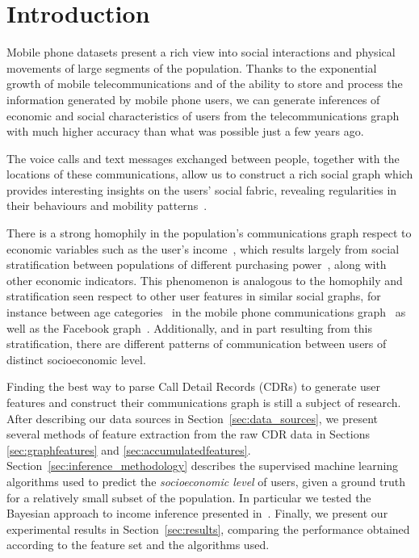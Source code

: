 \section{Introduction}

Mobile phone datasets present a rich view into social interactions and physical movements of large segments of the population. Thanks to the exponential growth of mobile telecommunications and of the ability to store and process the information generated by mobile phone users, we can generate inferences of economic and social characteristics of users from the telecommunications graph with much higher accuracy than what was possible just a few years ago.

The voice calls and text messages exchanged between people, together with the locations of these communications, allow us to construct a rich social graph which provides interesting insights on the users' social fabric, revealing regularities in their behaviours and mobility patterns~\cite{gonzalez2008understanding,ponieman2013human,sarraute2015city}.

There is a strong homophily in the population's communications graph respect to economic variables such as the user's income~\cite{fixmanasonam2016}, 
which results largely from social stratification between populations of different purchasing power~\cite{leo2015socioeconomic}, along with other economic indicators.
This phenomenon is analogous to the homophily and stratification seen respect to other user features in similar social graphs, for instance between age categories~\cite{mcpherson2001birds} in the mobile phone communications graph~\cite{sarraute2014} as well as the Facebook graph~\cite{ugander2011anatomy}.
Additionally, and in part resulting from this stratification, there are different patterns of communication between users of distinct socioeconomic level. 

Finding the best way to parse Call Detail Records (CDRs) to generate user features and construct their communications graph is still a subject of research. 
After describing our data sources in Section~\ref{sec:data_sources},
we present several methods of feature extraction from the raw CDR data in Sections \ref{sec:graphfeatures} and \ref{sec:accumulatedfeatures}.
Section~\ref{sec:inference_methodology} describes the supervised machine learning algorithms used to predict the \emph{socioeconomic level} of users, given a ground truth for a relatively small subset of the population. In particular we tested the Bayesian approach to income inference presented in~\cite{fixmanasonam2016}.
Finally, we present our experimental results in Section~\ref{sec:results}, 
comparing the performance obtained according to the feature set and the algorithms used.
 

